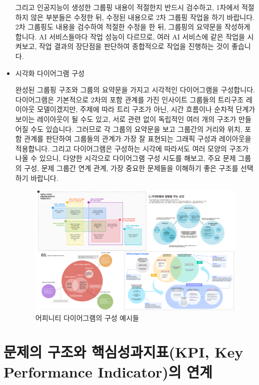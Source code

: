 \documentclass[
  letterpaper,
]{book}
\begin{document}
\begin{itemize}
  그리고 인공지능이 생성한 그룹핑 내용이 적절한지 반드시 검수하고,
  1차에서 적절하지 않은 부분들은 수정한 뒤, 수정된 내용으로 2차 그룹핑
  작업을 하기 바랍니다. 2차 그룹핑도 내용을 검수하여 적절한 수정을 한
  뒤, 그룹핑의 요약문을 작성하게 합니다. AI 서비스들마다 작업 성능이
  다르므로, 여러 AI 서비스에 같은 작업을 시켜보고, 작업 결과의 장단점을
  판단하여 종합적으로 작업을 진행하는 것이 좋습니다.
\item
  시각화 다이어그램 구성

  완성된 그룹핑 구조와 그룹의 요약문을 가지고 시각적인 다이어그램을
  구성합니다. 다이어그램은 기본적으로 2차의 포함 관계를 가진 인사이트
  그룹들의 트리구조 레이아웃 모델이겠지만, 주제에 따라 트리 구조가 아닌,
  시간 흐름이나 순차적 단계가 보이는 레이아웃이 될 수도 있고, 서로 관련
  없이 독립적인 여러 개의 구조가 만들어질 수도 있습니다. 그러므로 각
  그룹의 요약문을 보고 그룹간의 거리와 위치, 포함 관계를 판단하여
  그룹들의 관계가 가장 잘 표현되는 그래픽 구성과 레이아웃을 적용합니다.
  그리고 다이어그램은 구성하는 시각에 따라서도 여러 모양의 구조가 나올
  수 있으니, 다양한 시각으로 다이어그램 구성 시도를 해보고, 주요 문제
  그룹의 구성, 문제 그룹간 연계 관계, 가장 중요한 문제들을 이해하기 좋은
  구조를 선택하기 바랍니다.

  \begin{figure}[H]

  {\centering \includegraphics{img/fig23.png}

  }

  \caption{어피니티 다이어그램의 구성 예시들}

  \end{figure}%
\end{itemize}

\section{문제의 구조와 핵심성과지표(KPI, Key Performance Indicator)의
연계}\label{uxbb38uxc81cuxc758-uxad6cuxc870uxc640-uxd575uxc2ecuxc131uxacfcuxc9c0uxd45ckpi-key-performance-indicatoruxc758-uxc5f0uxacc4}
\end{document}
